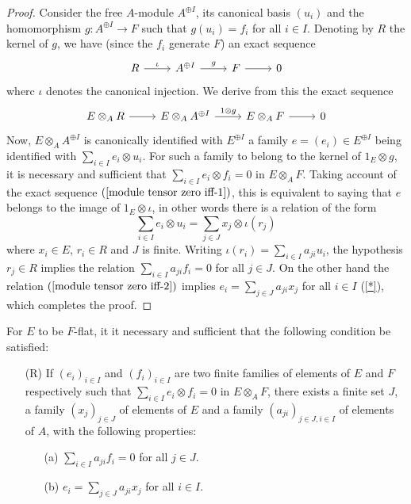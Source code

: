 \begin{proof}
Consider the free $A$-module $A^{\oplus I}$, its canonical basis $(u_i)$ and the homomorphism $g:A^{\oplus I}\to F$ such that $g(u_i)=f_i$ for all $i\in I$. Denoting by $R$ the kernel of $g$, we have (since the $f_i$ generate $F$) an exact sequence
\[\begin{tikzcd}
R\ar[r,"\iota"]&A^{\oplus I}\ar[r,"g"]&F\ar[r]&0
\end{tikzcd}\]
wherc $\iota$ denotes the canonical injection. We derive from this the exact sequence
\begin{equation}\label{module tensor zero iff-1}
\begin{tikzcd}
E\otimes_AR\ar[r]&E\otimes_AA^{\oplus I}\ar[r,"1\otimes g"]&E\otimes_AF\ar[r]&0
\end{tikzcd}
\end{equation}
Now, $E\otimes_AA^{\oplus I}$ is canonically identified with $E^{\oplus I}$ a family $e=(e_i)\in E^{\oplus I}$ being identified with $\sum_{i\in I}e_i\otimes u_i$. For such a family to belong to the kernel of $1_E\otimes g$, it is necessary and sufficient that $\sum_{i\in I}e_i\otimes f_i=0$ in $E\otimes_AF$. Taking account of the exact sequence $(\ref{module tensor zero iff-1})$, this is equivalent to saying that $e$ belongs to the image of $1_E\otimes\iota$, in other words there is a relation of the form
\begin{equation}\label{module tensor zero iff-2}
\sum_{i\in I}e_i\otimes u_i=\sum_{j\in J}x_j\otimes\iota(r_j)
\end{equation}
where $x_i\in E$, $r_i\in R$ and $J$ is finite. Writing $\iota(r_i)=\sum_{i\in I}a_{ji}u_i$, the hypothesis $r_j\in R$ implies the relation $\sum_{i\in I}a_{ji}f_i=0$ for all $j\in J$. On the other hand the relation $(\ref{module tensor zero iff-2})$ implies $e_i=\sum_{j\in J}a_{ji}x_j$ for all $i\in I$ (\cref{*}), which completes the proof.
\end{proof}
\begin{proposition}\label{module F-flat iff linear relation}
For $E$ to be $F$-flat, it it necessary and sufficient that the following condition be satisfied:
\begin{itemize}
\item[(R)] If $(e_i)_{i\in I}$ and $(f_i)_{i\in I}$ are two finite families of elements of $E$ and $F$ respectively such that $\sum_{i\in I}e_i\otimes f_i=0$ in $E\otimes_AF$, there exists a finite set $J$, a family $(x_j)_{j\in J}$ of elements of $E$ and a family $(a_{ji})_{j\in J,i\in I}$ of elements of $A$, with the following properties:
\begin{itemize}
\item[(a)] $\sum_{i\in I}a_{ji}f_i=0$ for all $j\in J$. 
\item[(b)] $e_i=\sum_{j\in J}a_{ji}x_j$ for all $i\in I$.
\end{itemize} 
\end{itemize}
\end{proposition}
